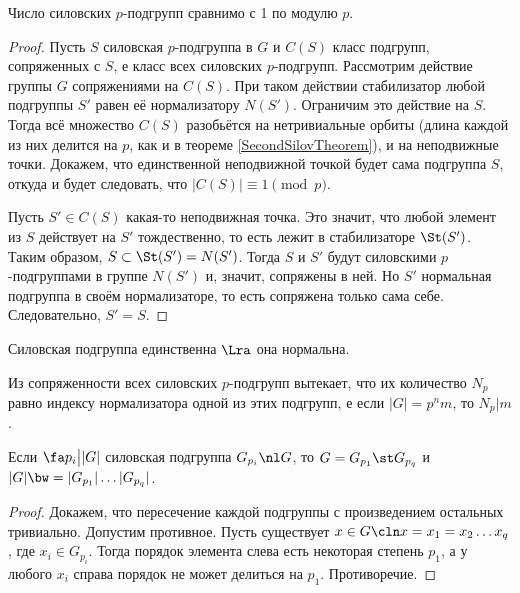 \documentclass[a4paper]{article}
\begin{document}
\begin{theorem}
Число силовских $p$-подгрупп сравнимо с 1 по модулю $p$.
\end{theorem}
\begin{proof}
Пусть $S$ силовская $p$-подгруппа в $G$ и $C(S)$ класс подгрупп, сопряженных с $S$, е класс всех
силовских $p$-подгрупп. Рассмотрим действие группы $G$ сопряжениями на $C(S)$. При таком действии
стабилизатор любой подгруппы $S'$ равен её нормализатору $N(S')$. Ограничим это действие на $S$. Тогда всё
множество $C(S)$ разобьётся на нетривиальные орбиты (длина каждой из них делится на $p$, как и в теореме
\ref{SecondSilovTheorem}), и на неподвижные точки. Докажем, что единственной неподвижной точкой
будет сама подгруппа $S$, откуда и будет следовать, что $|C(S)| \equiv 1 \pmod p$.

Пусть $S' \in C(S)$ какая-то неподвижная точка. Это значит, что любой элемент из $S$ действует  на $S'$
тождественно, то есть лежит в стабилизаторе $\St(S')$. Таким образом, $S \subset \St(S')=N(S')$. Тогда $S$ и
$S'$ будут силовскими $p$-подгруппами в группе $N(S')$ и, значит, сопряжены в ней. Но $S'$ нормальная
подгруппа в своём нормализаторе, то есть сопряжена только сама себе. Следовательно, $S'=S$.
\end{proof}

\begin{imp}\label{SylowFirstCor}
Силовская подгруппа единственна $\Lra$ она нормальна.
\end{imp}

\begin{imp}\label{SylowSecondCor}
Из сопряженности всех силовских $p$-подгрупп вытекает, что их количество $N_p$ равно индексу  нормализатора
одной из этих подгрупп, е если $|G|=p^nm$, то $N_p | m$.
\end{imp}

\begin{imp}
Если $\fa p_i \bigl||G|$ силовская подгруппа $G_{p_i}\nl G$, то $G = G_{p_1} \st G_{p_q}$ и $|G| \bw= |G_{p_1}| \ldots |G_{p_q}|$.
\end{imp}
\begin{proof}
Докажем, что пересечение каждой подгруппы с произведением остальных тривиально. Допустим противное.  Пусть
существует $x \in G\cln x=x_1=x_2 \ldots x_q$, где $x_i \in G_{p_i}$. Тогда порядок элемента слева есть
некоторая степень $p_1$, а у любого $x_i$ справа порядок не может делиться на $p_1$. Противоречие.
\end{proof}
\end{document}
